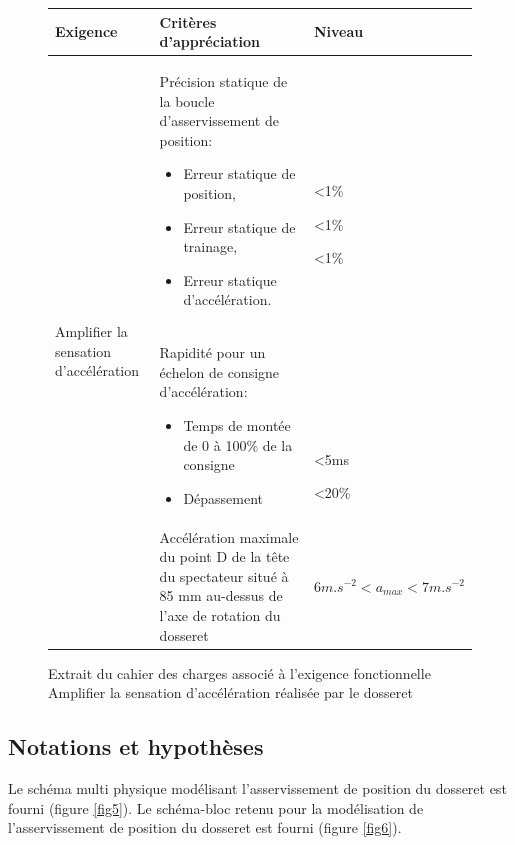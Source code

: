 \begin{figure}[!ht]
\begin{tabular}{|p{2cm}|p{8cm}|p{5cm}|}
\hline
\textbf{Exigence} & \textbf{Critères d'appréciation} & \textbf{Niveau} \\
\hline
\multirow{3}{2cm}{Amplifier la sensation d'accélération} & Précision statique de la boucle d'asservissement de position:
\begin{itemize}
 \item Erreur statique de position,
 \item Erreur statique de trainage,
 \item Erreur statique d'accélération.
\end{itemize}
& \par ~\ \par ~\ \par <1\% \par <1\% \par <1\% \par \\
\cline{2-3}
& Rapidité pour un échelon de consigne d'accélération:
\begin{itemize}
 \item Temps de montée de 0 à 100\% de la consigne 
 \item Dépassement	
\end{itemize}
& \par ~\ \par ~\ \par ~\ \par <5ms \par <20\% \\
\cline{2-3}
& Accélération maximale du point D de la tête du spectateur situé à 85 mm au-dessus de l'axe de rotation du dosseret & $6m.s^{-2} < a_{max} < 7m.s^{-2}$ \\
\hline
\end{tabular}
\caption{Extrait du cahier des charges associé à l'exigence fonctionnelle \og Amplifier la sensation d'accélération \fg réalisée par le dosseret}
\label{fig4}
\end{figure}

\newpage

\subsection{Notations et hypothèses}

Le schéma multi physique modélisant l'asservissement de position du dosseret est fourni (figure \ref{fig5}).
Le schéma-bloc retenu pour la modélisation de l'asservissement de position du dosseret est fourni (figure \ref{fig6}).

